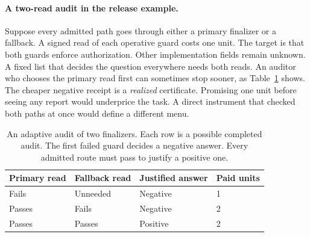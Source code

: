 \paragraph{A two-read audit in the release example.}
Suppose every admitted path goes through either a primary finalizer or a fallback. A signed read of each operative guard costs one unit. The target is that both guards enforce authorization. Other implementation fields remain unknown. A fixed list that decides the question everywhere needs both reads. An auditor who chooses the primary read first can sometimes stop sooner, as Table~\ref{tab:audit} shows. The cheaper negative receipt is a \emph{realized} certificate. Promising one unit before seeing any report would underprice the task. A direct instrument that checked both paths at once would define a different menu.
\par\begin{table}[htbp]\centering\small
\caption{An adaptive audit of two finalizers. Each row is a possible completed audit. The first failed guard decides a negative answer. Every admitted route must pass to justify a positive one.}\label{tab:audit}
\begin{tabular}{llll}\toprule
Primary read & Fallback read & Justified answer & Paid units\\\midrule
Fails & Unneeded & Negative & 1\\
Passes & Fails & Negative & 2\\
Passes & Passes & Positive & 2\\\bottomrule
\end{tabular}
\end{table}

